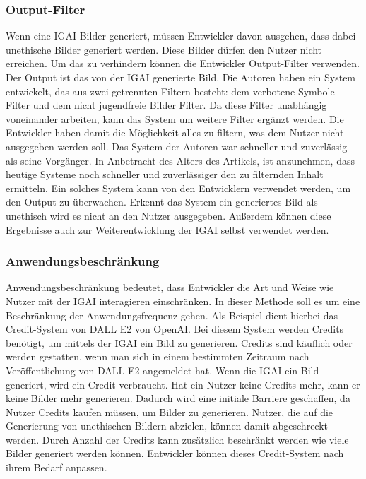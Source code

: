 \documentclass[12pt]{article}
\begin{document}
\subsubsection{Output-Filter}
Wenn eine IGAI Bilder generiert, müssen Entwickler davon ausgehen, dass dabei unethische Bilder generiert werden. Diese Bilder dürfen den Nutzer nicht erreichen. Um das zu verhindern können die Entwickler Output-Filter verwenden. Der Output ist das von der IGAI generierte Bild. Die Autoren \cite{Zheng} haben ein System entwickelt, das aus zwei getrennten Filtern besteht: dem verbotene Symbole Filter und dem nicht jugendfreie Bilder Filter. Da diese Filter unabhängig voneinander arbeiten, kann das System um weitere Filter ergänzt werden. Die Entwickler haben damit die Möglichkeit alles zu filtern, was dem Nutzer nicht ausgegeben werden soll. Das System der Autoren war schneller und zuverlässig als seine Vorgänger. In Anbetracht des Alters des Artikels, ist anzunehmen, dass heutige Systeme noch schneller und zuverlässiger den zu filternden Inhalt ermitteln. Ein solches System kann von den Entwicklern verwendet werden, um den Output zu überwachen. Erkennt das System ein generiertes Bild als unethisch wird es nicht an den Nutzer ausgegeben. Außerdem können diese Ergebnisse auch zur Weiterentwicklung der IGAI selbst verwendet werden.

\subsubsection{Anwendungsbeschränkung}
Anwendungsbeschränkung bedeutet, dass Entwickler die Art und Weise wie Nutzer mit der IGAI interagieren einschränken. In dieser Methode soll es um eine Beschränkung der Anwendungsfrequenz gehen. Als Beispiel dient hierbei das Credit-System von DALL E2 von OpenAI. Bei diesem System werden Credits benötigt, um mittels der IGAI ein Bild zu generieren. Credits sind käuflich oder werden gestatten, wenn man sich in einem bestimmten Zeitraum nach Veröffentlichung von DALL E2 angemeldet hat. Wenn die IGAI ein Bild generiert, wird ein Credit verbraucht. Hat ein Nutzer keine Credits mehr, kann er keine Bilder mehr generieren. Dadurch wird eine initiale Barriere geschaffen, da Nutzer Credits kaufen müssen, um Bilder zu generieren. Nutzer, die auf die Generierung von unethischen Bildern abzielen, können damit abgeschreckt werden. Durch Anzahl der Credits kann zusätzlich beschränkt werden wie viele Bilder generiert werden können. Entwickler können dieses Credit-System nach ihrem Bedarf anpassen.
\end{document}
